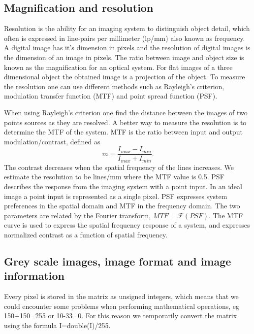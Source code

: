 \subsection{Magnification and resolution}
Resolution is the ability for an imaging system to distinguish object detail, which often is expressed in line-pairs per millimeter (lp/mm) also known as frequency. \cite{introd-mtf} %
A digital image has it's dimension in pixels and the resolution of digital images is the dimension of an image in pixels. The ratio between image and object size is known as the magnification for an optical system. For flat images of a three dimensional object the obtained image is a projection of the object. To measure the resolution one can use different methods such as Rayleigh's criterion, modulation transfer function (MTF) and point spread function (PSF). 

When using Rayleigh's criterion one find the distance between the images of two points sources as they are resolved. A better way to measure the resolution is to determine the MTF of the system. MTF is the ratio between input and output modulation/contrast, defined as \[ m = \frac{I_{max}-I_{min}}{I_{max}+I_{min}}. \] The contrast decreases when the spatial frequency of the lines increases. We estimate the resolution to be lines/mm where the MTF value is 0.5. \cite{lab-hand} %
PSF describes the response from the imaging system with a point input. In an ideal image a point input is represented as a single pixel. PSF expresses system preferences in the spatial domain and MTF in the frequency domain. The two parameters are related by the Fourier transform, $ MTF = \mathcal{F}(PSF) $. The MTF curve is used to express the spatial frequency response of a system, and expresses normalized contrast as a function of spatial frequency. \cite{mia-kth} %

\subsection{Grey scale images, image format and image information}
Every pixel is stored in the matrix as unsigned integers, which means that we could encounter some problems when performing mathematical operations, eg 150+150=255 or 10-33=0. For this reason we temporarily convert the matrix using the formula I=double(I)/255. 

